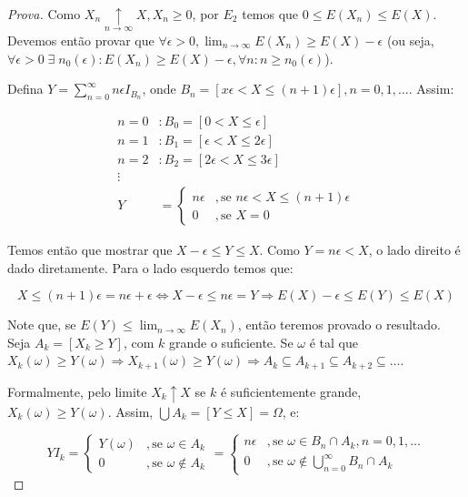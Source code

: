 \documentclass[
]{article}
\theoremstyle{definition}
\theoremstyle{definition}
\theoremstyle{definition}
\theoremstyle{definition}
\theoremstyle{remark}
\begin{document}
\begin{proof}[Prova]
Como \(X_{n} \underset{n \to \infty}{\uparrow} X, X_{n} \ge 0\), por \(E_{2}\) temos que \(0 \le E(X_{n}) \le E(X)\). Devemos então provar que \(\forall \epsilon > 0, \lim_{n \to \infty}E(X_{n}) \ge E(X) - \epsilon\) (ou seja, \(\forall \epsilon > 0 \;\exists\; n_{0}(\epsilon) : E(X_{n}) \ge E(X) - \epsilon, \forall n: n \ge n_{0}(\epsilon)\)).

Defina \(Y = \sum_{n=0}^{\infty}n\epsilon I_{B_{n}}\), onde \(B_{n} = [x\epsilon < X \le (n+1)\epsilon], n = 0,1,\ldots\). Assim:

\begin{align*}
n=0 &: B_{0} = [0 < X \le \epsilon] \\
n=1 &: B_{1} = [\epsilon < X \le 2\epsilon] \\
n=2 &: B_{2} = [2\epsilon < X \le 3\epsilon] \\
\vdots &\; \\
Y &= \begin{cases}
n\epsilon &, \text{se } n\epsilon < X \le (n+1)\epsilon \\
0 &, \text{se }X = 0
\end{cases}
\end{align*}

Temos então que mostrar que \(X - \epsilon \le Y \le X\). Como \(Y = n\epsilon < X\), o lado direito é dado diretamente. Para o lado esquerdo temos que:

\begin{equation*}
X \le (n+1)\epsilon = n\epsilon + \epsilon \Leftrightarrow X - \epsilon \le n\epsilon = Y \Rightarrow E(X) - \epsilon \le E(Y) \le E(X)
\end{equation*}

Note que, se \(E(Y) \le \lim_{n \to \infty}E(X_{n})\), então teremos provado o resultado. Seja \(A_{k} = [X_{k} \ge Y]\), com \(k\) grande o suficiente. Se \(\omega\) é tal que \(X_{k}(\omega) \ge Y(\omega) \Rightarrow X_{k+1}(\omega) \ge Y(\omega) \Rightarrow A_{k} \subseteq A_{k+1} \subseteq A_{k+2} \subseteq \ldots\).

Formalmente, pelo limite \(X_{k} \uparrow X\) se \(k\) é suficientemente grande, \(X_{k}(\omega) \ge Y(\omega)\). Assim, \(\bigcup A_{k} = [Y \le X] = \Omega\), e:

\begin{equation*}
YI_{k} = \begin{cases}
Y(\omega) &, \text{se }\omega \in A_{k} \\
0 &, \text{se } \omega \not\in A_{k}
\end{cases} = \begin{cases}
n\epsilon &, \text{se }\omega \in B_{n} \cap A_{k}, n=0,1,\ldots \\
0 &, \text{se } \omega \not\in \bigcup_{n=0}^{\infty}B_{n}\cap A_{k}
\end{cases}
\end{equation*}


\end{proof}
\end{document}
